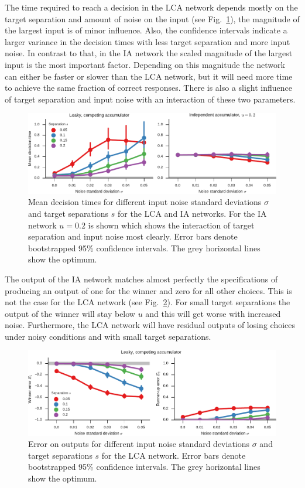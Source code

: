 \documentclass[10pt,letterpaper]{article}
\begin{document}
The time required to reach a decision in the LCA network depends mostly on the target separation and amount of noise on the input (see Fig.~\ref{fig:time}), the magnitude of the largest input is of minor influence.
Also, the confidence intervals indicate a larger variance in the decision times with less target separation and more input noise.
In contrast to that, in the IA network the scaled magnitude of the largest input is the most important factor.
Depending on this magnitude the network can either be faster or slower than the LCA network, but it will need more time to achieve the same fraction of correct responses.
There is also a slight influence of target separation and input noise with an interaction of these two parameters.
\begin{figure}
    \centering
    \includegraphics{figures/time}
    \caption{ \label{fig:time}
        Mean decision times for different input noise standard deviations $\sigma$ and target separations $s$ for the LCA and IA networks.
        For the IA network $u = 0.2$ is shown which shows the interaction of target separation and input noise most clearly.
        Error bars denote bootstrapped 95\% confidence intervals.
        The grey horizontal lines show the optimum.
    }
\end{figure}

The output of the IA network matches almost perfectly the specifications of producing an output of one for the winner and zero for all other choices.
This is not the case for the LCA network (see Fig.~\ref{fig:error}).
For small target separations the output of the winner will stay below $u$ and this will get worse with increased noise.
Furthermore, the LCA network will have residual outputs of losing choices under noisy conditions and with small target separations.
\begin{figure}
    \centering
    \includegraphics{figures/error}
    \caption{ \label{fig:error}
        Error on outputs for different input noise standard deviations $\sigma$ and target separations $s$ for the LCA network.
        Error bars denote bootstrapped 95\% confidence intervals.
        The grey horizontal lines show the optimum.
    }
\end{figure}
\end{document}
